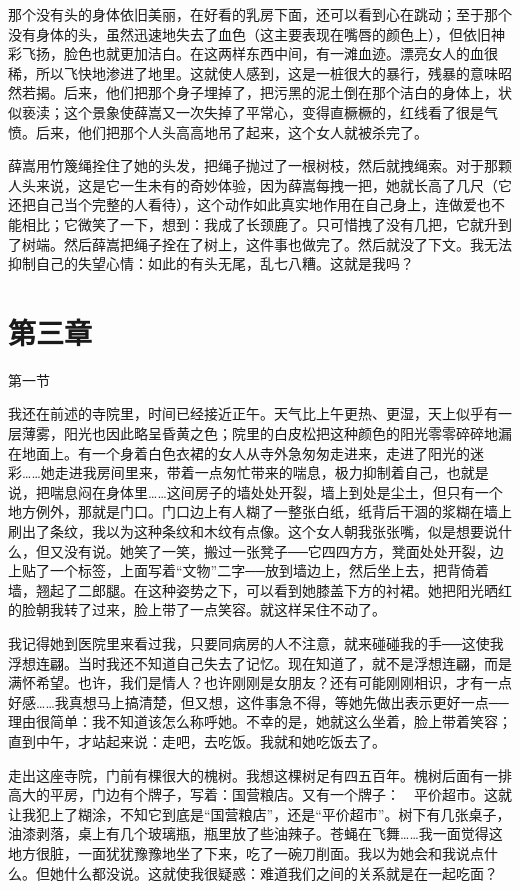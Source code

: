 那个没有头的身体依旧美丽，在好看的乳房下面，还可以看到心在跳动；至于那个没有身体的头，虽然迅速地失去了血色（这主要表现在嘴唇的颜色上），但依旧神彩飞扬，脸色也就更加洁白。在这两样东西中间，有一滩血迹。漂亮女人的血很稀，所以飞快地渗进了地里。这就使人感到，这是一桩很大的暴行，残暴的意味昭然若揭。后来，他们把那个身子埋掉了，把污黑的泥土倒在那个洁白的身体上，状似亵渎；这个景象使薛嵩又一次失掉了平常心，变得直橛橛的，红线看了很是气愤。后来，他们把那个人头高高地吊了起来，这个女人就被杀完了。 

薛嵩用竹篾绳拴住了她的头发，把绳子抛过了一根树枝，然后就拽绳索。对于那颗人头来说，这是它一生未有的奇妙体验，因为薛嵩每拽一把，她就长高了几尺（它还把自己当个完整的人看待），这个动作如此真实地作用在自己身上，连做爱也不能相比；它微笑了一下，想到：我成了长颈鹿了。只可惜拽了没有几把，它就升到了树端。然后薛嵩把绳子拴在了树上，这件事也做完了。然后就没了下文。我无法抑制自己的失望心情：如此的有头无尾，乱七八糟。这就是我吗？

\section{第三章}

第一节 

我还在前述的寺院里，时间已经接近正午。天气比上午更热、更湿，天上似乎有一层薄雾，阳光也因此略呈昏黄之色；院里的白皮松把这种颜色的阳光零零碎碎地漏在地面上。有一个身着白色衣裙的女人从寺外急匆匆走进来，走进了阳光的迷彩……她走进我房间里来，带着一点匆忙带来的喘息，极力抑制着自己，也就是说，把喘息闷在身体里……这间房子的墙处处开裂，墙上到处是尘土，但只有一个地方例外，那就是门口。门口边上有人糊了一整张白纸，纸背后干涸的浆糊在墙上刷出了条纹，我以为这种条纹和木纹有点像。这个女人朝我张张嘴，似是想要说什么，但又没有说。她笑了一笑，搬过一张凳子──它四四方方，凳面处处开裂，边上贴了一个标签，上面写着“文物”二字──放到墙边上，然后坐上去，把背倚着墙，翘起了二郎腿。在这种姿势之下，可以看到她膝盖下方的衬裙。她把阳光晒红的脸朝我转了过来，脸上带了一点笑容。就这样呆住不动了。 

我记得她到医院里来看过我，只要同病房的人不注意，就来碰碰我的手──这使我浮想连翩。当时我还不知道自己失去了记忆。现在知道了，就不是浮想连翩，而是满怀希望。也许，我们是情人？也许刚刚是女朋友？还有可能刚刚相识，才有一点好感……我真想马上搞清楚，但又想，这件事急不得，等她先做出表示更好一点──理由很简单：我不知道该怎么称呼她。不幸的是，她就这么坐着，脸上带着笑容；直到中午，才站起来说：走吧，去吃饭。我就和她吃饭去了。 

走出这座寺院，门前有棵很大的槐树。我想这棵树足有四五百年。槐树后面有一排高大的平房，门边有个牌子，写着：国营粮店。又有一个牌子：　平价超市。这就让我犯上了糊涂，不知它到底是“国营粮店”，还是“平价超市”。树下有几张桌子，油漆剥落，桌上有几个玻璃瓶，瓶里放了些油辣子。苍蝇在飞舞……我一面觉得这地方很脏，一面犹犹豫豫地坐了下来，吃了一碗刀削面。我以为她会和我说点什么。但她什么都没说。这就使我很疑惑：难道我们之间的关系就是在一起吃面？ 

